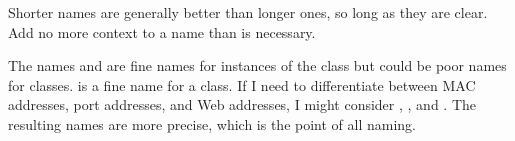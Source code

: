 Shorter names are generally better than longer ones, so long as they are clear. Add no more context to a name than is necessary.

The names  and  are fine names for instances of the class  but could be poor names for classes.  is a fine name for a class. If I need to differentiate between MAC addresses, port addresses, and Web addresses, I might
consider , , and . The resulting names are more precise, which is the point of all naming.